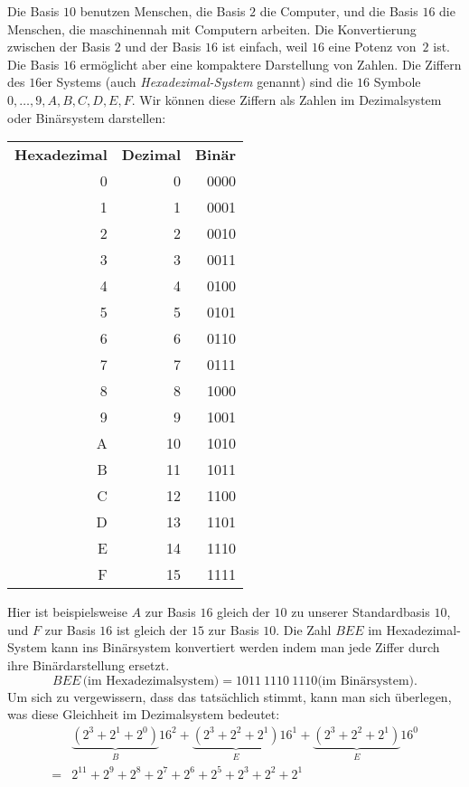 \begin{bsp}
	Die Basis $10$ benutzen Menschen, die Basis $2$ die Computer, und die Basis $16$ die Menschen, die maschinennah mit Computern arbeiten. Die Konvertierung zwischen der Basis $2$ und der Basis $16$ ist einfach, weil $16$ eine Potenz von~$2$ ist. Die Basis $16$ ermöglicht aber eine kompaktere Darstellung von Zahlen. Die Ziffern des $16$er Systems (auch \emph{Hexadezimal-System} genannt) sind die $16$ Symbole $0,\ldots,9,A,B,C,D,E,F$. Wir können diese Ziffern als Zahlen im Dezimalsystem oder Binärsystem darstellen:
	\begin{center}
		\scriptsize 
		\begin{tabular}{rrr}
			\textbf{Hexadezimal} & \textbf{Dezimal} & \textbf{Binär}
			\\ 0 & 0 & 0000
			\\ 1 & 1 & 0001
			\\ 2 & 2 & 0010
			\\ 3 & 3 & 0011
			\\ 4 & 4 & 0100
			\\ 5 & 5 & 0101
			\\ 6 & 6 & 0110
			\\ 7 & 7 & 0111
			\\ 8 & 8 & 1000
			\\ 9 & 9 & 1001
			\\ A & 10 & 1010
			\\ B & 11 & 1011
			\\ C & 12 & 1100
			\\ D & 13 & 1101
			\\ E & 14 & 1110
			\\ F & 15 & 1111
		\end{tabular}
	\end{center}
	Hier ist beispielsweise $A$ zur Basis $16$ gleich der $10$ zu unserer Standardbasis $10$, und $F$ zur Basis $16$ ist gleich der $15$ zur Basis $10$. Die Zahl $BEE$ im Hexadezimal-System kann ins Binärsystem konvertiert werden indem man jede Ziffer durch ihre Binärdarstellung ersetzt. 
	\[
	BEE \, \text{(im Hexadezimalsystem)} = 1011 \ 1110 \ 1110 \text{(im Binärsystem)}.
	\]
	Um sich zu vergewissern, dass das tatsächlich stimmt, kann man sich überlegen, was diese Gleichheit im Dezimalsystem bedeutet:
	\begin{align*}
		& \underbrace{(2^3 + 2^1+ 2^0)}_{B} 16^2 + \underbrace{(2^3 + 2^2 + 2^1)}_{E} 16^1 + \underbrace{(2^3 + 2^2 + 2^1)}_{E} 16^0  
		\\ = & 2^{11} + 2^9 + 2^8 + 2^7 + 2^6 + 2^5 + 2^3 + 2^2 + 2^1
	\end{align*}
\end{bsp}


